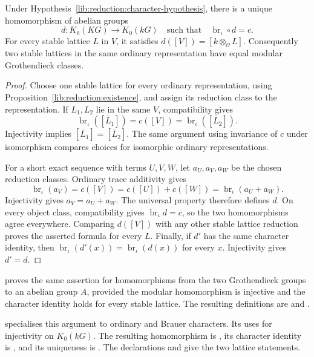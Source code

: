 \begin{theorem}
\label{lib:reduction:decomposition-theorem}
Under Hypothesis~\ref{lib:reduction:character-hypothesis}, there is a unique
homomorphism of abelian groups
\[
 d:K_0(KG)\longrightarrow K_0(kG)
 \quad\text{such that}\quad
 \operatorname{br}_{\iota}\circ d=c.
\]
For every stable lattice $L$ in $V$, it satisfies
$d([V])=[k\otimes_{\mathcal O}L]$. Consequently two stable lattices in
the same ordinary representation have equal modular Grothendieck classes.
\end{theorem}
\begin{proof}
Choose one stable lattice for every ordinary representation, using
Proposition~\ref{lib:reduction:existence}, and assign its reduction class
to the representation. If $L_1,L_2$ lie in the same $V$, compatibility gives
\[
 \operatorname{br}_{\iota}([\overline L_1])
  =c([V])
  =\operatorname{br}_{\iota}([\overline L_2]).
\]
Injectivity implies $[\overline L_1]=[\overline L_2]$. The same argument
using invariance of $c$ under isomorphism compares choices for isomorphic
ordinary representations.

For a short exact sequence with terms $U,V,W$, let $a_U,a_V,a_W$ be the
chosen reduction classes. Ordinary trace additivity gives
\[
 \operatorname{br}_{\iota}(a_V)
   =c([V])=c([U])+c([W])
   =\operatorname{br}_{\iota}(a_U+a_W).
\]
Injectivity gives $a_V=a_U+a_W$.
The universal property therefore defines $d$. On every object class,
compatibility gives $\operatorname{br}_{\iota}d=c$, so the two
homomorphisms agree everywhere. Comparing $d([V])$ with any other stable
lattice reduction proves the asserted formula for every $L$.
Finally, if $d'$ has the same character identity, then
$\operatorname{br}_{\iota}(d'(x))=\operatorname{br}_{\iota}(d(x))$
for every $x$. Injectivity gives $d'=d$.
\end{proof}

\begin{implementation}
 proves the same assertion for
homomorphisms from the two Grothendieck groups to an abelian group $A$,
provided the modular homomorphism is injective and the character identity
holds for every stable lattice. The resulting definitions are
 and
.

 specialises this argument to
ordinary and Brauer characters. Its
 uses
 for injectivity on $K_0(kG)$.
The resulting homomorphism is ,
its character identity is
, and its
uniqueness is .
The declarations
 and
 give the two lattice statements.
\end{implementation}


